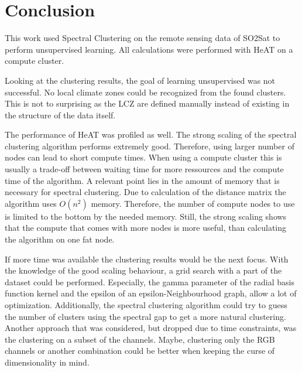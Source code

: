\section{Conclusion}
\label{sec:conclusion}
This work used Spectral Clustering on the remote sensing data of SO2Sat to perform unsupervised learning.
All calculations were performed with \gls{HeAT} on a compute cluster.

Looking at the clustering results, the goal of learning unsupervised was not successful.
No local climate zones could be recognized from the found clusters. This is not to surprising as the \gls{LCZ}  are defined
manually instead of existing in the structure of the data itself.

The performance of \gls{HeAT} was profiled as well.
The strong scaling of the spectral clustering algorithm performs extremely good.
Therefore, using larger number of nodes can lead to short compute times.
When using a compute cluster this is usually a trade-off between waiting time for more ressources and the compute time of the algorithm.
A relevant point lies in the amount of memory that is necessary for spectral clustering. Due to calculation of the distance matrix
the algorithm uses \(O(n^2)\) memory.
Therefore, the number of compute nodes to use is limited to the bottom by the needed memory.
Still, the strong scaling shows that the compute that comes with more nodes is more useful, than calculating the algorithm on one fat node.

If more time was available the clustering results would be the next focus.
With the knowledge of the good scaling behaviour, a grid search with a part of the dataset could be performed.
Especially, the gamma parameter of the radial basis function kernel and the epsilon of an epsilon-Neighbourhood graph, allow a lot of optimization.
Additionally, the spectral clustering algorithm could try to guess the number of clusters using the spectral gap to get a more natural clustering.
Another approach that was considered, but dropped due to time constraints, was the clustering on a subset of the channels.
Maybe, clustering only the RGB channels or another combination could be better when keeping the curse of dimensionality in mind.
